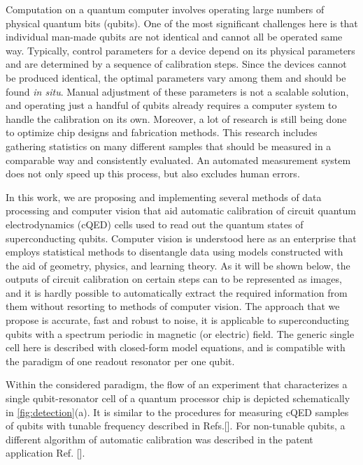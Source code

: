 \documentclass[%
 aip,
 amsmath,amssymb,
 reprint,%
]{revtex4-1}
\begin{document}
Computation on a quantum computer involves operating large numbers of physical quantum bits (qubits). One of the most significant challenges here is that individual man-made qubits are not identical and cannot all be operated same way\cite{kelly2018, chen2018}. Typically, control parameters for a device depend on its physical parameters and are determined by a sequence of calibration steps. Since the devices cannot be produced identical, the optimal parameters vary among them and should be found \textit{in situ}. Manual adjustment of these parameters is not a scalable solution, and operating just a handful of qubits already requires a computer system to handle the calibration on its own. Moreover, a lot of research is still being done to optimize chip designs and fabrication methods. This research includes gathering statistics on many different samples that should be measured in a comparable way and consistently evaluated. An automated measurement system does not only speed up this process, but also excludes human errors.

In this work, we are proposing and implementing several methods of data processing and computer vision that aid automatic calibration of circuit quantum electrodynamics (cQED)\cite{blais2007} cells used to read out the quantum states of superconducting qubits. Computer vision is understood here as an enterprise that employs statistical methods to disentangle data using models constructed with the aid of geometry, physics, and learning theory.\cite{forsyth2011} As it will be shown below, the outputs of circuit calibration on certain steps can to be represented as images, and it is hardly possible to automatically extract the required information from them without resorting to methods of computer vision. The approach that we propose is accurate, fast and robust to noise, it is applicable to superconducting qubits with a spectrum periodic in magnetic (or electric) field. The generic single cell here is described with closed-form model equations, and is compatible with the paradigm of one readout resonator per one qubit.\cite{versluis2017, kelly2015} 

Within the considered paradigm, the flow of an experiment that characterizes a single qubit-resonator cell of a quantum processor chip is depicted schematically in \autoref{fig:detection}(a). It is similar to the  procedures for measuring cQED samples of qubits with tunable frequency described in Refs.[]. For non-tunable qubits, a different algorithm of automatic calibration was described in the patent application Ref. []. 
\end{document}
